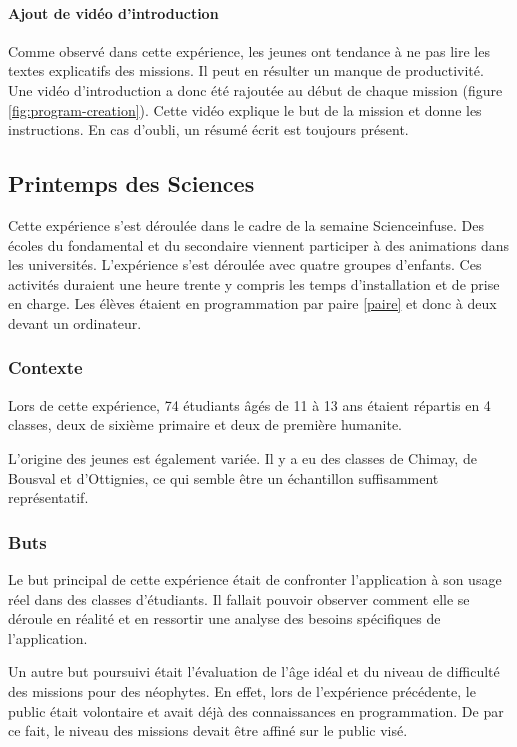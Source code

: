 \paragraph{Ajout de vidéo d'introduction}
Comme observé dans cette expérience, les jeunes ont tendance à ne pas lire les textes explicatifs des \glspl{mission}. Il peut en résulter un manque de productivité. Une vidéo d'introduction a donc été rajoutée au début de chaque \gls{mission} (figure \ref{fig:program-creation}). Cette vidéo explique le but de la \gls{mission} et donne les instructions. En cas d'oubli, un résumé écrit est toujours présent.

\subsection{Printemps des Sciences}
Cette expérience s'est déroulée dans le cadre de la semaine Scienceinfuse. Des écoles du \gls{fondamental} et du \gls{secondaire} viennent participer à des animations dans les universités. L'expérience s'est déroulée avec quatre groupes d'enfants. Ces activités duraient une heure trente y compris les temps d'installation et de prise en charge. Les élèves étaient en programmation par paire \ref{paire} et donc à deux devant un ordinateur.

\subsubsection{Contexte}
Lors de cette expérience, 74 étudiants âgés de 11 à 13 ans étaient répartis en 4 classes, deux de sixième \gls{primaire} et deux de première \gls{humanite}.

L'origine des jeunes est également variée. Il y a eu des classes de Chimay, de Bousval et d'Ottignies, ce qui semble être un échantillon suffisamment représentatif.

\subsubsection{Buts}
Le but principal de cette expérience était de confronter l'application à son usage réel dans des classes d'étudiants. Il fallait pouvoir observer comment elle se déroule en réalité et en ressortir une analyse des besoins spécifiques de l'application.

Un autre but poursuivi était l'évaluation de l'âge idéal et du niveau de difficulté des \glspl{mission} pour des néophytes. En effet, lors de l'expérience précédente, le public était volontaire et avait déjà des connaissances en programmation. De par ce fait, le niveau des \glspl{mission} devait être affiné sur le public visé.

